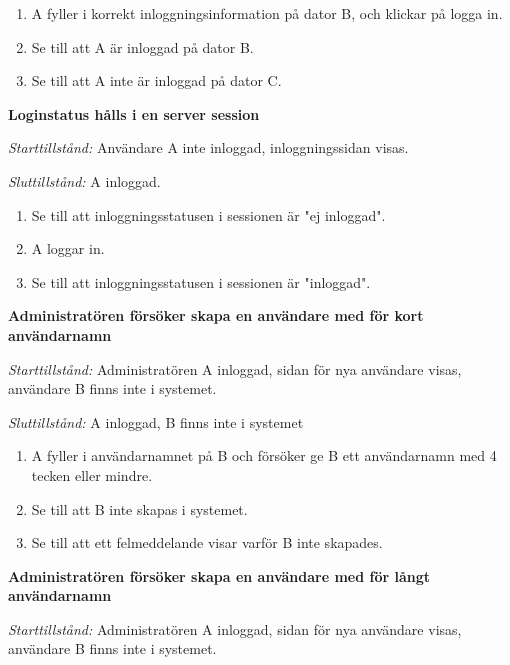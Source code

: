 \documentclass[a4paper]{article}
\begin{document}
\begin{FT}
\begin{enumerate}
\item A fyller i korrekt inloggningsinformation på dator B, och klickar på logga in.
\item Se till att A är inloggad på dator B.
\item Se till att A inte är inloggad på dator C.
\end{enumerate}


\item
\textbf{Loginstatus hålls i en server session}

\emph{Starttillstånd:} Användare A inte inloggad, inloggningssidan visas.

\emph{Sluttillstånd:} A inloggad.

\begin{enumerate}
\item Se till att inloggningsstatusen i sessionen är "ej inloggad".
\item A loggar in.
\item Se till att inloggningsstatusen i sessionen är "inloggad".
\end{enumerate}





\item
\textbf{Administratören försöker skapa en användare med för kort användarnamn}

\emph{Starttillstånd:} Administratören A inloggad, sidan för nya användare visas, användare B finns inte i systemet.

\emph{Sluttillstånd:} A inloggad, B finns inte i systemet

\begin{enumerate}
\item A fyller i användarnamnet på B och försöker ge B ett användarnamn med 4 tecken eller mindre.
\item Se till att B inte skapas i systemet.
\item Se till att ett felmeddelande visar varför B inte skapades.
\end{enumerate}

\item
\textbf{Administratören försöker skapa en användare med för långt användarnamn}

\emph{Starttillstånd:} Administratören A inloggad, sidan för nya användare visas, användare B finns inte i systemet.


\end{FT}
\end{document}
